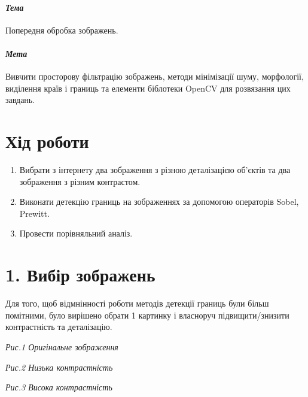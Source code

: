 \documentclass{/home/alx/Documents/LaTex/nulp}
\begin{document}

\paragraph*{\textit{Тема}} Попередня обробка зображень.

\paragraph*{\textit{Мета}} Вивчити просторову фільтрацію зображень, методи мінімізації шуму, морфології, виділення країв і границь та елементи біблотеки
OpenCV для розвязання цих завдань.

\justify

\section*{Хід роботи}
\begin{enumerate}
\item Вибрати з інтернету два зображення з різною деталізацією об’єктів та два зображення з різним контрастом.
\item Виконати детекцію границь на зображеннях за допомогою операторів Sobel,
Prewitt.
\item Провести порівняльний аналіз.
\end{enumerate}

\newpage

\section*{1. Вибір зображень}

Для того, щоб відмнінності роботи методів детекції границь були більш помітними, було вирішено обрати 1 картинку і власноруч підвищити/знизити контрастність та деталізацію.

\begin{center}

\textit{Рис.1 Оригінальне зображення}
\end{center}

\begin{center}

\textit{Рис.2 Низька контрастність}
\end{center}

\begin{center}

\textit{Рис.3 Висока контрастність}
\end{center}
\end{document}
